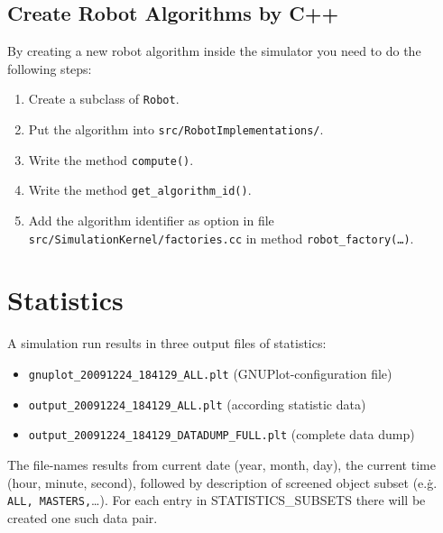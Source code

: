 \documentclass[a4paper,halfparskip,11pt,twoside]{scrartcl}
\begin{document}
\subsection{Create Robot Algorithms by C++}
By creating a new robot algorithm inside the simulator you need to do the following steps:
\begin{enumerate}
	\item Create a subclass of \texttt{Robot}.
	\item Put the algorithm into \texttt{src/RobotImplementations/}.
	\item Write the method \texttt{compute()}.
	\item Write the method \texttt{get\_algorithm\_id()}.
	\item Add the algorithm identifier as option in file \texttt{src/SimulationKernel/factories.cc} in method \texttt{robot\_factory(\dots)}.
\end{enumerate}



\section{Statistics}
A simulation run results in three output files of statistics:

\begin{itemize}
\item \texttt{gnuplot\_20091224\_184129\_ALL.plt} (GNUPlot-configuration file)
\item \texttt{output\_20091224\_184129\_ALL.plt} (according statistic data)
\item \texttt{output\_20091224\_184129\_DATADUMP\_FULL.plt} (complete data dump)
\end{itemize}

The file-names results from current date (year, month, day), the current time (hour, minute, second), followed by description of screened object subset (e.\.g. \texttt{ALL, MASTERS,}\dots). For each entry in STATISTICS\_SUBSETS there will be created one such data pair.

\newpage
\appendix


\newpage


\newpage
\thispagestyle{empty}
~
\end{document}
